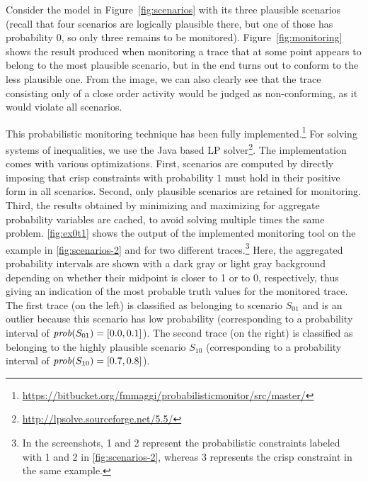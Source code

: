 \begin{example}
  Consider the \pdeclare model in Figure~\ref{fig:scenarios} with its three plausible scenarios (recall that four scenarios are logically plausible there, but one of those has probability $0$, so only three remains to be monitored). Figure~\ref{fig:monitoring} shows the result produced when monitoring a trace that at some point appears to belong to the most plausible scenario, but in the end turns out to conform to the less plausible one. From the image, we can also clearly see that the trace consisting only of a close order activity would be judged as non-conforming, as it would violate all scenarios.
\end{example}

This probabilistic monitoring technique has been fully implemented.\footnote{\url{https://bitbucket.org/fmmaggi/probabilisticmonitor/src/master/}} For solving systems of inequalities, we use the Java based LP solver\footnote{\url{http://lpsolve.sourceforge.net/5.5/}}. The implementation comes with various optimizations. First, scenarios are computed by directly imposing that crisp constraints with probability $1$ must hold in their positive form in all scenarios. Second, only plausible scenarios are retained for monitoring. Third, the results obtained by minimizing and maximizing for aggregate probability variables are cached, to avoid solving multiple times the same problem.
\figurename \ref{fig:ex0t1} shows the output of the implemented monitoring tool on the example in \figurename \ref{fig:scenarios-2} and for two different traces.\footnote{In the screenshots, 1 and 2 represent the probabilistic constraints labeled with 1 and 2 in \figurename \ref{fig:scenarios-2}, whereas 3 represents the crisp constraint in the same example.} Here, the aggregated probability intervals are shown with a dark gray or light gray background depending on whether their midpoint is closer to 1 or to 0, respectively, thus giving an indication of the most probable truth values for the monitored trace. The first trace (on the left) is classified as belonging to scenario $S_{01}$ and is an outlier because this scenario has low probability (corresponding to a probability interval of $\mathit{prob}(S_{01})= [0.0,0.1]$). The second trace (on the right) is classified as belonging to the highly plausible scenario $S_{10}$ (corresponding to a probability interval of $\mathit{prob}(S_{10})= [0.7,0.8]$).





